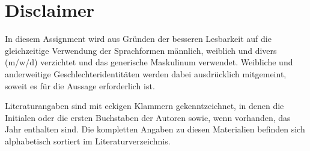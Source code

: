 \chapter*{Disclaimer}
In diesem Assignment wird aus Gründen der besseren Lesbarkeit auf die gleichzeitige Verwendung der Sprachformen männlich, weiblich und divers (m/w/d) verzichtet und das generische Maskulinum verwendet. Weibliche und anderweitige Geschlechteridentitäten werden dabei ausdrücklich mitgemeint, soweit es für die Aussage erforderlich ist.

\vspace{0.25cm}
Literaturangaben sind mit eckigen Klammern gekenntzeichnet, in denen die Initialen oder die ersten Buchstaben der Autoren sowie, wenn vorhanden, das Jahr enthalten sind. Die kompletten Angaben zu diesen Materialien befinden sich alphabetisch sortiert im Literaturverzeichnis.